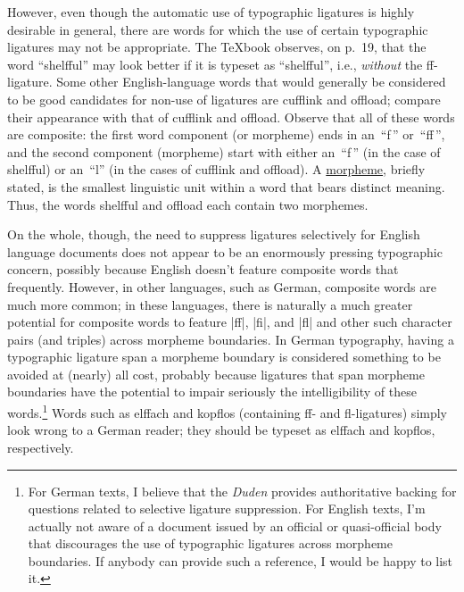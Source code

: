 \documentclass[12pt]{article}
\begin{document}
However, even though the automatic use of typographic ligatures is highly desirable in general, there are words for which the use of certain typographic ligatures may not be appropriate. The \TeX book observes, on p.~19, that the word \enquote{\mbox{shelfful}} may look better if it is typeset as \enquote{shelfful}, i.e., \emph{without} the ff-ligature. Some other English-language words that would generally be considered to be good candidates for non-use of ligatures are \mbox{cufflink} and \mbox{offload}; compare their appearance with that of cufflink and offload. Observe that all of these words are composite: the first word component (or morpheme) ends in an~\enquote{f\,} or~\enquote{ff\,}, and the second component (morpheme) start with either an~\enquote{f\,} (in the case of shelfful) or an~\enquote{l} (in the cases of cufflink and offload). A \href{http://en.wikipedia.org/wiki/Morpheme}{morpheme}, briefly stated, is the smallest linguistic unit within a word that bears distinct meaning. Thus, the words shelfful and offload each contain two morphemes. 

On the whole, though, the need to suppress ligatures selectively for English language documents does not appear to be an enormously pressing typographic concern, possibly because English doesn't feature composite words that frequently. However, in other languages, such as German, composite words are much more common; in these languages, there is naturally a much greater potential for composite words to feature |ff|, |fi|, and |fl| and other such character pairs (and triples) across morpheme boundaries. In German typography, having a typographic ligature span a morpheme boundary is considered something to be avoided at (nearly) all cost, probably because ligatures that span morpheme boundaries have the potential to impair seriously the intelligibility of these words.\footnote{For German texts, I believe that the \emph{Duden} provides authoritative backing for questions related to selective ligature suppression. For English texts, I'm actually not aware of a document issued by an official or quasi-official body that discourages the use of typographic ligatures across morpheme boundaries. If anybody can provide such a reference, I would be happy to list it.} Words such as \mbox{elffach} and \mbox{kopflos}  (containing ff- and fl-ligatures) simply look wrong to a German reader; they should be typeset as elffach and kopflos, respectively.
\end{document}
